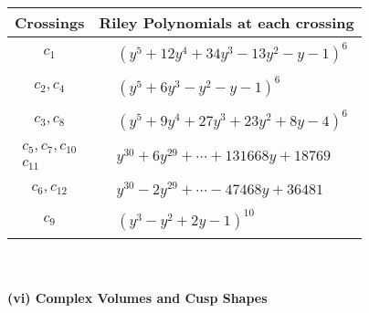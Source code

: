 \documentclass[1p]{elsarticle_modified}
\theoremstyle{definition}
\begin{document}
\begin{tabular}{m{50pt}|m{274pt}}
Crossings & \hspace{64pt}Riley Polynomials at each crossing \\
\hline $$\begin{aligned}c_{1}\end{aligned}$$&$\begin{aligned}
&(y^5+12 y^4+34 y^3-13 y^2- y-1)^6
\end{aligned}$\\
\hline $$\begin{aligned}c_{2},c_{4}\end{aligned}$$&$\begin{aligned}
&(y^5+6 y^3- y^2- y-1)^6
\end{aligned}$\\
\hline $$\begin{aligned}c_{3},c_{8}\end{aligned}$$&$\begin{aligned}
&(y^5+9 y^4+27 y^3+23 y^2+8 y-4)^6
\end{aligned}$\\
\hline $$\begin{aligned}c_{5},c_{7},c_{10}\\c_{11}\end{aligned}$$&$\begin{aligned}
&y^{30}+6 y^{29}+\cdots+131668 y+18769
\end{aligned}$\\
\hline $$\begin{aligned}c_{6},c_{12}\end{aligned}$$&$\begin{aligned}
&y^{30}-2 y^{29}+\cdots-47468 y+36481
\end{aligned}$\\
\hline $$\begin{aligned}c_{9}\end{aligned}$$&$\begin{aligned}
&(y^3- y^2+2 y-1)^{10}
\end{aligned}$\\
\hline
\end{tabular}\\~\\
\newpage\flushleft \textbf{(vi) Complex Volumes and Cusp Shapes}
\end{document}
